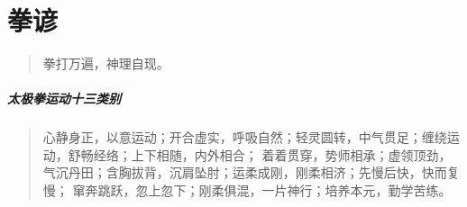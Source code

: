 \chapter{拳谚}

\begin{quote}
  拳打万遍，神理自现。
\end{quote}

\paragraph{太极拳运动十三类别}
\begin{quote}
  心静身正，以意运动；开合虚实，呼吸自然；轻灵圆转，中气贯足；缠绕运动，舒畅经络；上下相随，内外相合；
  着着贯穿，势师相承；虚领顶劲，气沉丹田；含胸拔背，沉肩坠肘；运柔成刚，刚柔相济；先慢后快，快而复慢；
  窜奔跳跃，忽上忽下；刚柔俱混，一片神行；培养本元，勤学苦练。
\end{quote}

\begin{quote}
\end{quote}

\begin{quote}
\end{quote}

\begin{quote}
\end{quote}
